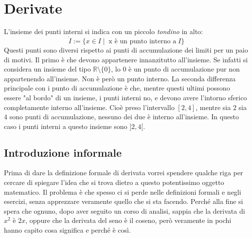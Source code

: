 \section{Derivate}

L'insieme dei punti interni si indica con un piccolo \textit{tondino} in alto:
\begin{equation*}
	\mathring{I} := \{x \in I \; | \;\; \text{x è un punto interno a}\;I\} 
\end{equation*}
Questi punti sono diversi rispetto ai punti di accumulazione dei limiti per un 
paio di motivi. Il primo è che devono appartenere innanzitutto all'insieme. Se 
infatti si considera un insieme del tipo $\mathbb{R} \setminus \{0\}$, lo $0$ è 
un punto di accumulazione pur non appartenendo all'insieme. Non è però un punto 
interno. La seconda differenza principale con i punto di accumulazione è che, 
mentre questi ultimi possono essere "al bordo" di un insieme, i punti interni 
no, e devono avere l'intorno sferico completamente interno all'insieme. Cioè 
preso l'intervallo $[2, 4]$, mentre sia $2$ sia $4$ sono punti di 
accumulazione, nessuno dei due è interno all'insieme. In questo caso i punti 
interni a questo insieme sono $]2,4[$.

\subsection{Introduzione informale}
Prima di dare la definizione formale di derivata vorrei spendere qualche riga 
per cercare di spiegare l'idea che si trova dietro a questo potentissimo 
oggetto matematico. Il problema è che spesso ci si perde nelle definizioni 
formali e negli esercizi, senza apprezzare veramente quello che si sta facendo. 
Perché alla fine si spera che ognuno, dopo aver seguito un corso di analisi, 
sappia che la derivata di $x^2$ è $2x$, oppure che la derivata del seno è il 
coseno, però veramente in pochi hanno capito cosa significa e perché è così.\\


